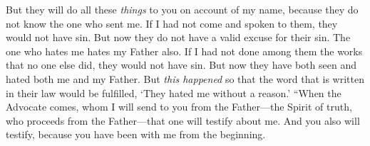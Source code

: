 \begin{biblechapter}
\verse But they will do all these \textit{things} to you on account of my name, because they do not know the one who sent me.
\verse If I had not come and spoken to them, they would not have sin. But now they do not have a valid excuse for their sin.
\verse The one who hates me hates my Father also.
\verse If I had not done among them the works that no one else did, they would not have sin. But now they have both seen and hated both me and my Father.
\verse But \textit{this happened} so that the word that is written in their law would be fulfilled, ‘They hated me without a reason.’
\verse “When the Advocate comes, whom I will send to you from the Father—the Spirit of truth, who proceeds from the Father—that one will testify about me.
\verse And you also will testify, because you have been with me from the beginning.
\end{biblechapter}

